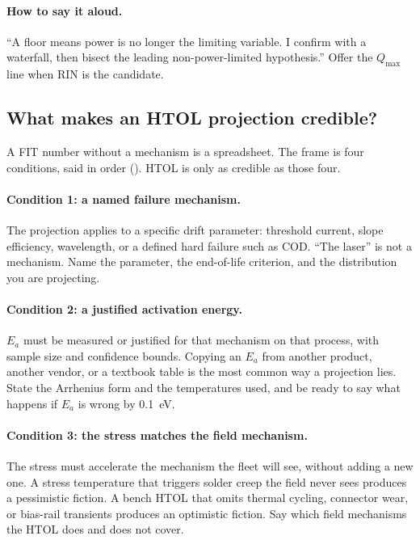 \paragraph{How to say it aloud.}
``A floor means power is no longer the limiting variable. I confirm with a
waterfall, then bisect the leading non-power-limited hypothesis.'' Offer the
$Q_{\max}$ line when RIN is the candidate.

\subsection{What makes an HTOL projection credible?}
\label{sec:interview-worked-htol}

A FIT number without a mechanism is a spreadsheet. The frame
is four conditions, said in order ().
HTOL is only as credible as those four.

\paragraph{Condition 1: a named failure mechanism.}
The projection applies to a specific drift parameter: threshold current,
slope efficiency, wavelength, or a defined hard failure such as
COD. ``The laser'' is not a mechanism. Name the parameter, the
end-of-life criterion, and the distribution you are projecting.

\paragraph{Condition 2: a justified activation energy.}
$E_a$ must be measured or justified for that mechanism on that process, with
sample size and confidence bounds. Copying an $E_a$ from another product,
another vendor, or a textbook table is the most common way a projection lies.
State the Arrhenius form and the temperatures used, and
be ready to say what happens if $E_a$ is wrong by 0.1~eV.

\paragraph{Condition 3: the stress matches the field mechanism.}
The stress must accelerate the mechanism the fleet will see, without adding a
new one. A stress temperature that triggers solder creep the field never sees
produces a pessimistic fiction. A bench HTOL that omits thermal cycling,
connector wear, or bias-rail transients produces an optimistic fiction. Say
which field mechanisms the HTOL does and does not cover.

